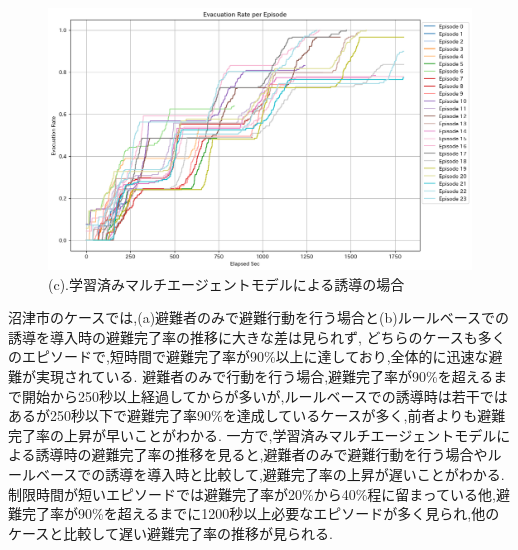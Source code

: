 \begin{figure}[H]
  \vspace{1em} %
  \begin{minipage}{0.65\textwidth}
      \centering
      \includegraphics[width=\textwidth]{Figures/Numazu-AgentModel-ERE.png} %
      \caption{(c).学習済みマルチエージェントモデルによる誘導の場合}
      \label{fig:numazu-guid-graph-c}
  \end{minipage}
\end{figure}
沼津市のケースでは,(a)避難者のみで避難行動を行う場合と(b)ルールベースでの誘導を導入時の避難完了率の推移に大きな差は見られず,
どちらのケースも多くのエピソードで,短時間で避難完了率が90\%以上に達しており,全体的に迅速な避難が実現されている.
避難者のみで行動を行う場合,避難完了率が90\%を超えるまで開始から250秒以上経過してからが多いが,ルールベースでの誘導時は若干ではあるが250秒以下で避難完了率90\%を達成しているケースが多く,前者よりも避難完了率の上昇が早いことがわかる.
一方で,学習済みマルチエージェントモデルによる誘導時の避難完了率の推移を見ると,避難者のみで避難行動を行う場合やルールベースでの誘導を導入時と比較して,避難完了率の上昇が遅いことがわかる.
制限時間が短いエピソードでは避難完了率が20\%から40\%程に留まっている他,避難完了率が90\%を超えるまでに1200秒以上必要なエピソードが多く見られ,他のケースと比較して遅い避難完了率の推移が見られる.

